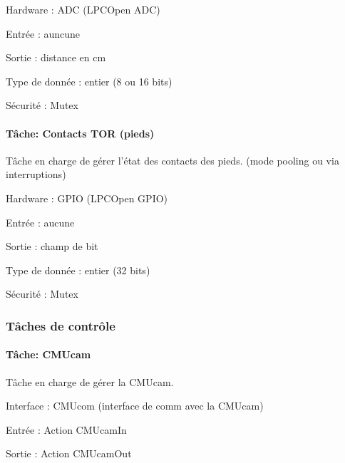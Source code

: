 \begin{DoxyItemize}
\item Hardware \-: A\-D\-C (L\-P\-C\-Open A\-D\-C)
\item Entrée \-: auncune
\item Sortie \-: distance en cm
\begin{DoxyItemize}
\item Type de donnée \-: entier (8 ou 16 bits)
\item Sécurité \-: Mutex
\end{DoxyItemize}
\end{DoxyItemize}

\paragraph*{Tâche\-: Contacts T\-O\-R (pieds)}

Tâche en charge de gérer l'état des contacts des pieds. (mode pooling ou via interruptions)


\begin{DoxyItemize}
\item Hardware \-: G\-P\-I\-O (L\-P\-C\-Open G\-P\-I\-O)
\item Entrée \-: aucune
\item Sortie \-: champ de bit
\begin{DoxyItemize}
\item Type de donnée \-: entier (32 bits)
\item Sécurité \-: Mutex
\end{DoxyItemize}
\end{DoxyItemize}

\subsubsection*{Tâches de contrôle}

\paragraph*{Tâche\-: C\-M\-Ucam}

Tâche en charge de gérer la C\-M\-Ucam.


\begin{DoxyItemize}
\item Interface \-: C\-M\-Ucom (interface de comm avec la C\-M\-Ucam)
\item Entrée \-: Action C\-M\-Ucam\-In
\item Sortie \-: Action C\-M\-Ucam\-Out
\end{DoxyItemize}

